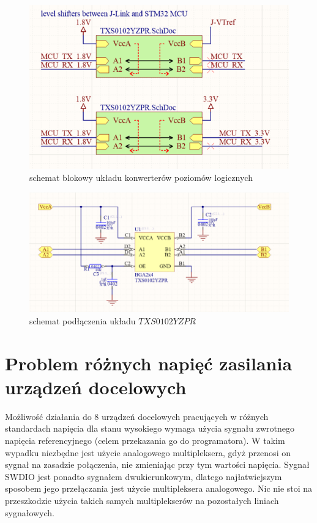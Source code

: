 \begin{figure}[H]
    \centering
    \includegraphics[width=0.55\paperwidth]{images/MCU_level_shifters.png}
    \caption{schemat blokowy układu konwerterów poziomów logicznych}
    \label{UART_level_shifters}
\end{figure}

\begin{figure}[H]
    \centering
    \includegraphics[width=0.55\paperwidth]{images/level_shifter_component_sheet.png}
    \caption{schemat podłączenia  układu $TXS0102YZPR$}
    \label{level shifter component sheet}
    \end{figure}

\section{Problem różnych napięć zasilania urządzeń docelowych}
Możliwość działania do 8 urządzeń docelowych pracujących w różnych standardach napięcia dla stanu wysokiego wymaga użycia sygnału zwrotnego napięcia referencyjnego (celem przekazania go do programatora). W takim wypadku niezbędne jest użycie analogowego multipleksera, gdyż przenosi on sygnał na zasadzie połączenia, nie zmieniając przy tym wartości napięcia. Sygnał SWDIO jest ponadto sygnałem dwukierunkowym, dlatego najłatwiejszym sposobem jego przełączania jest użycie multipleksera analogowego. Nic nie stoi na przeszkodzie użycia takich samych multiplekserów na pozostałych liniach sygnałowych.

